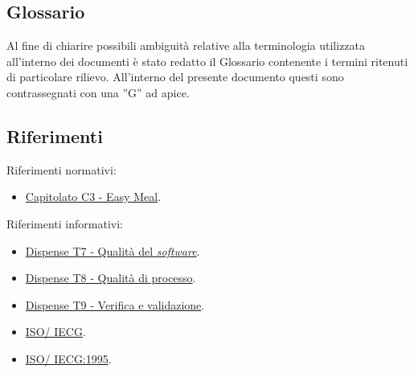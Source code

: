\subsection{Glossario}
Al fine di chiarire possibili ambiguità relative alla terminologia utilizzata all'interno dei documenti è stato redatto il Glossario contenente i termini ritenuti di particolare rilievo.
All'interno del presente documento questi sono contrassegnati con una ”G” ad apice.

\subsection{Riferimenti}
Riferimenti normativi:
\begin{itemize}
    \item \href{https://www.math.unipd.it/~tullio/IS-1/2023/Progetto/C3.pdf}{Capitolato C3 - Easy Meal}.
\end{itemize}

\noindent
Riferimenti informativi:
\begin{itemize}
    \item \href{https://www.math.unipd.it/~tullio/IS-1/2023/Dispense/T7.pdf}{Dispense T7 - Qualità del \textit{software}}.
    \item \href{https://www.math.unipd.it/~tullio/IS-1/2023/Dispense/T8.pdf}{Dispense T8 - Qualità di processo}.
    \item \href{https://www.math.unipd.it/~tullio/IS-1/2023/Dispense/T9.pdf}{Dispense T9 - Verifica e validazione}.
    \item \href{https://it.wikipedia.org/wiki/ISO/IEC_9126}{ISO\g/ IECG}.
    \item \href{https://www.math.unipd.it/~tullio/IS-1/2009/Approfondimenti/ISO_12207-1995.pdf}{ISO\g/ IECG:1995}.
\end{itemize}
